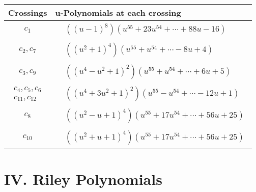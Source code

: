 \documentclass[1p]{elsarticle_modified}
\theoremstyle{definition}
\begin{document}
\begin{tabular}{m{50pt}|m{274pt}}
Crossings & \hspace{64pt}u-Polynomials at each crossing \\
\hline $$\begin{aligned}c_{1}\end{aligned}$$&$\begin{aligned}
&((u-1)^8)(u^{55}+23 u^{54}+\cdots+88 u-16)
\end{aligned}$\\
\hline $$\begin{aligned}c_{2},c_{7}\end{aligned}$$&$\begin{aligned}
&((u^2+1)^4)(u^{55}+u^{54}+\cdots-8 u+4)
\end{aligned}$\\
\hline $$\begin{aligned}c_{3},c_{9}\end{aligned}$$&$\begin{aligned}
&((u^4- u^2+1)^2)(u^{55}+u^{54}+\cdots+6 u+5)
\end{aligned}$\\
\hline $$\begin{aligned}c_{4},c_{5},c_{6}\\c_{11},c_{12}\end{aligned}$$&$\begin{aligned}
&((u^4+3 u^2+1)^2)(u^{55}- u^{54}+\cdots-12 u+1)
\end{aligned}$\\
\hline $$\begin{aligned}c_{8}\end{aligned}$$&$\begin{aligned}
&((u^2- u+1)^4)(u^{55}+17 u^{54}+\cdots+56 u+25)
\end{aligned}$\\
\hline $$\begin{aligned}c_{10}\end{aligned}$$&$\begin{aligned}
&((u^2+u+1)^4)(u^{55}+17 u^{54}+\cdots+56 u+25)
\end{aligned}$\\
\hline
\end{tabular}\newpage\renewcommand{\arraystretch}{1}
\centering \section*{ IV. Riley Polynomials}
\end{document}
